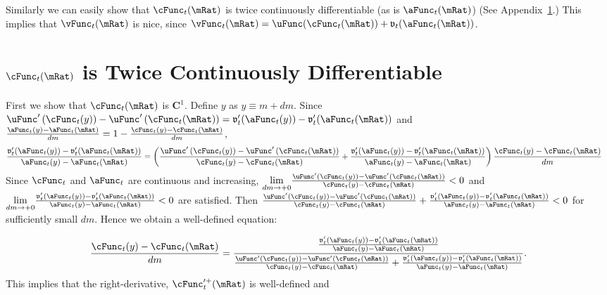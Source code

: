 \documentclass[\econtexRoot/BufferStockTheory]{subfiles}
\begin{document}
Similarly we can easily show that $\cFunc_{t}(\mRat)$ is twice
continuously differentiable (as is $\aFunc_{t}(\mRat)$) (See
Appendix~\ref{sec:CIsTwiceDifferentiable}.)  This implies that
$\vFunc_{t}(\mRat)$ is nice, since
$\vFunc_{t}(\mRat)=\uFunc(\cFunc_{t}(\mRat))+\mathfrak{v}_{t}({\aFunc}_{t}(\mRat))$.

\hypertarget{cFunc-is-Twice-Continuously-Differentiable}{}
\section{
  \texorpdfstring{$\cFunc_{t}(\mRat)$}{c} is Twice Continuously Differentiable}\label{sec:CIsTwiceDifferentiable}

First we show that $\cFunc_{t}(\mRat)$ is $\mathbf{C}^{1}$.  Define $y$ as $y\equiv m+dm$.  Since $\uFunc^{\prime }\left( \cFunc_{t}(y)\right) -\uFunc^{\prime }\left(
    \cFunc_{t}(\mRat)\right) =\mathfrak{v}_{t}^{\prime
  }({\aFunc}_{t}(y))-\mathfrak{v}_{t}^{\prime }({\aFunc}_{t}(\mRat))$ and $
  \frac{{\aFunc}_{t}(y)-{\aFunc}_{t}(\mRat)}{dm}=1-\frac{\cFunc_{t}(y)-\cFunc_{t}(\mRat)}{dm}$,
\begin{align*}
  \frac{\mathfrak{v}_{t}^{\prime }({\aFunc}_{t}(y))-\mathfrak{v}_{t}^{\prime }({\aFunc}_{t}(\mRat))}{{\aFunc}_{t}(y)-{\aFunc}_{t}(\mRat)} %
  & =   
       \left( \frac{\uFunc^{\prime }\left( \cFunc_{t}(y)\right) -\uFunc^{\prime }\left( \cFunc_{t}(\mRat)\right) }{\cFunc_{t}(y)-\cFunc_{t}(\mRat)}+\frac{\mathfrak{v}_{t}^{\prime }({\aFunc}_{t}(y))-\mathfrak{v}_{t}^{\prime }({\aFunc}_{t}(\mRat))}{{\aFunc}_{t}(y)-{\aFunc}_{t}(\mRat)}\right) \frac{\cFunc_{t}(y)-\cFunc_{t}(\mRat)}{dm}
\end{align*}
Since $\cFunc_{t}$ and $\aFunc_{t}$ are continuous and increasing, $\underset{
dm\rightarrow +0}{\lim }\frac{\uFunc^{\prime }\left( \cFunc_{t}(y)\right) -\uFunc^{\prime
}\left( \cFunc_{t}(\mRat)\right) }{\cFunc_{t}(y)-\cFunc_{t}(\mRat)}<0$ and
$\underset{dm\rightarrow+0}{\lim }\frac{\mathfrak{v}_{t}^{\prime }({\aFunc}_{t}(y))-\mathfrak{v}_{t}^{\prime }({\aFunc}_{t}(\mRat))}{
{\aFunc}_{t}(y)-{\aFunc}_{t}(\mRat)}< 0$
are satisfied. Then $\frac{\uFunc^{\prime }\left(
\cFunc_{t}(y)\right) -\uFunc^{\prime }\left( \cFunc_{t}(\mRat)\right) }{\cFunc_{t}(y)-\cFunc_{t}(\mRat)}+
\frac{\mathfrak{v}_{t}^{\prime }({\aFunc}_{t}(y))-\mathfrak{v}_{t}^{\prime }({\aFunc}_{t}(\mRat))}{{\aFunc}_{t}(y)-{\aFunc}_{t}(\mRat)}
<0$ for sufficiently small $dm$.
 Hence we obtain a well-defined equation:

\begin{equation*}
\frac{\cFunc_{t}(y)-\cFunc_{t}(\mRat)}{dm}=\frac{\frac{\mathfrak{v}_{t}^{\prime
}({\aFunc}_{t}(y))-\mathfrak{v}_{t}^{\prime }({\aFunc}_{t}(\mRat))}{{\aFunc}_{t}(y)-{\aFunc}_{t}(\mRat)}}{\frac{\uFunc^{\prime
}\left( \cFunc_{t}(y)\right) -\uFunc^{\prime }\left( \cFunc_{t}(\mRat)\right) }{
\cFunc_{t}(y)-\cFunc_{t}(\mRat)}+\frac{\mathfrak{v}_{t}^{\prime }({\aFunc}_{t}(y))-\mathfrak{v}_{t}^{\prime }({\aFunc}_{t}(\mRat))
}{{\aFunc}_{t}(y)-{\aFunc}_{t}(\mRat)}}.
\end{equation*}
This implies that the right-derivative, $\cFunc_{t}^{\prime +}(\mRat)$ is
well-defined and
\end{document}
